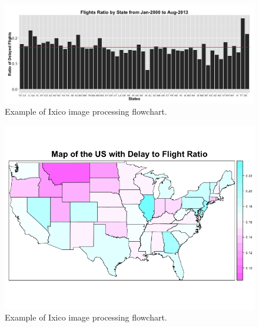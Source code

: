 \documentclass[11pt,twoside,titlepage]{article}
\begin{document}
\begin{figure}[h!]
        \centering
                \includegraphics[width=16cm]{Delays_by_State2.png}
        \caption{Example of Ixico image processing flowchart.}\label{fig:flowchart}
\end{figure}

\begin{figure}[h!]
        \centering
                \includegraphics[width=16cm]{USMap2.png}
        \caption{Example of Ixico image processing flowchart.}\label{fig:flowchart}
\end{figure}
\end{document}
